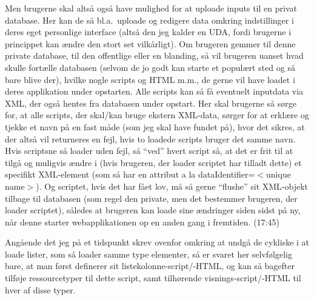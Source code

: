 \documentclass{report}
\begin{document}
Men brugerne skal altså også have mulighed for at uploade inputs til en privat database. Her kan de så bl.a.\ uploade og redigere data omkring indstillinger i deres eget personlige interface (altså den jeg kalder en UDA, fordi brugerne i princippet kan ændre den stort set vilkårligt). Om brugeren gemmer til denne private database, til den offentlige eller en blanding, så vil brugeren uanset hvad skulle fortælle databasen (selvom de jo godt kan starte et populært sted og så bare blive der), hvilke nogle scripts og HTML m.m., de gerne vil have loadet i deres applikation under opstarten. Alle scripts kan så få eventuelt inputdata via XML, der også hentes fra databasen under opstart. Her skal brugerne så sørge for, at alle scripts, der skal/kan bruge ekstern XML-data, sørger for at erklære og tjekke et navn på en fast måde (som jeg skal have fundet på), hvor det sikres, at der altså vil returneres en fejl, hvis to loadede scripts bruger det samme navn. Hvis scriptsne så loader uden fejl, så ``ved'' hvert script så, at det er frit til at tilgå og muligvis ændre i (hvis brugeren, der loader scriptet har tilladt dette) et specifikt XML-element (som så har en attribut a la dataIdentifier=$<$unique name$>$). Og scriptet, hvis det har fået lov, må så gerne ``flushe'' sit XML-objekt tilbage til databasen (som regel den private, men det bestemmer brugeren, der loader scriptet), således at brugeren kan loade sine ændringer siden sidst på ny, når denne starter webapplikationen op en anden gang i fremtiden. (17:45)

Angående det jeg på et tidspunkt skrev ovenfor omkring at undgå de cykliske i at loade lister, som så loader samme type elementer, så er svaret her selvfølgelig bare, at man først definerer sit listekolonne-script/-HTML, og kan så bagefter tilføje ressourcetyper til dette script, samt tilhørende visnings-script/-HTML til hver af disse typer. 
\end{document}
